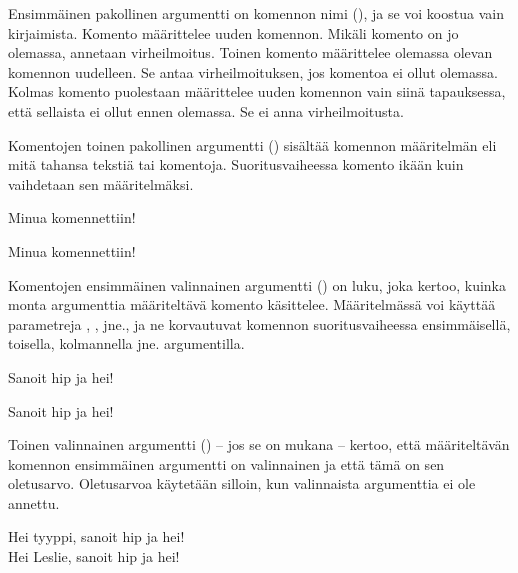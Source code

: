 Ensimmäinen pakollinen argumentti on komennon nimi (), ja
se voi koostua vain kirjaimista. Komento 
määrittelee uuden komennon. Mikäli komento on jo olemassa, annetaan
virheilmoitus. Toinen komento  määrittelee
olemassa olevan komennon uudelleen. Se antaa virheilmoituksen, jos
komentoa ei ollut olemassa. Kolmas komento 
puolestaan määrittelee uuden komennon vain siinä tapauksessa, että
sellaista ei ollut ennen olemassa. Se ei anna virheilmoitusta.

Komentojen toinen pakollinen argumentti () sisältää
komennon määritelmän eli mitä tahansa tekstiä tai komentoja.
Suoritusvaiheessa komento ikään kuin vaihdetaan sen määritelmäksi.

\begin{koodilohkosis}
\newcommand{\komento}{Minua komennettiin!}
\komento
\end{koodilohkosis}

\begin{tulossis}
  Minua komennettiin!
\end{tulossis}

Komentojen ensimmäinen valinnainen argumentti () on luku, joka
kertoo, kuinka monta argumenttia määriteltävä komento käsittelee.
Määritelmässä voi käyttää parametreja , ,
 jne., ja ne korvautuvat komennon suoritusvaiheessa
ensimmäisellä, toisella, kolmannella jne. argumentilla.

\begin{koodilohkosis}
\newcommand{\komento}[2]{Sanoit #1 ja #2!}
\komento{hip}{hei}
\end{koodilohkosis}

\begin{tulossis}
  Sanoit hip ja hei!
\end{tulossis}

Toinen valinnainen argumentti () -- jos se on mukana --
kertoo, että määriteltävän komennon ensimmäinen argumentti on
valinnainen ja että tämä on sen oletusarvo. Oletusarvoa käytetään
silloin, kun valinnaista argumenttia ei ole annettu.

\begin{koodilohkosis}
\newcommand{\komento}[3][tyyppi]{Hei #1, sanoit #2 ja #3!}
\komento{hip}{hei} \\
\komento[Leslie]{hip}{hei}
\end{koodilohkosis}

